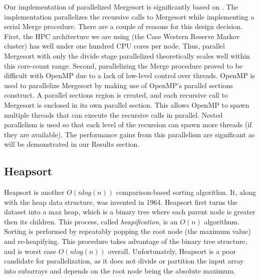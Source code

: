 \documentclass[conference]{IEEEtran}
\begin{document}
    Our implementation of parallelized Mergesort is significantly based on \cite{radenski_mergesort}. The implementation parallelizes the recursive calls to Mergesort while implementing a serial Merge procedure. There are a couple of reasons for this design decision. First, the HPC architecture we are using (the Case Western Reserve Markov cluster) has well under one hundred CPU cores per node. Thus, parallel Mergesort with only the divide stage parallelized theoretically scales well within this core-count range. Second, parallelizing the Merge procedure proved to be difficult with OpenMP due to a lack of low-level control over threads. OpenMP is used to parallelize Mergesort by making use of OpenMP's parallel sections construct. A parallel sections region is created, and each recursive call to Mergesort is enclosed in its own parallel section. This allows OpenMP to spawn multiple threads that can execute the recursive calls in parallel. Nested parallelism is used so that each level of the recursion can spawn more threads (if they are available). The performance gains from this parallelism are significant as will be demonstrated in our Results section.
    
    
    \subsection{Heapsort}
    Heapsort is another $O(nlog(n))$ comparison-based sorting algorithm. 
    It, along with the heap data structure, was invented in 1964. \cite{forsythe_algorithms_1964}
    Heapsort first turns the dataset into a max heap, which is a binary tree where each parent node is greater then its children. 
    This process, called \textit{heapification}, is an $O(n)$ algorithum. 
    Sorting is performed by repeatably popping the root node (the maximum value) and re-heapifying. 
    This procedure takes advantage of the binary tree structure, and is worst case $O(n log (n))$ overall.  \cite{cormen_introduction_2009}
    Unfortunately, Heapsort is a poor candidate for parallelization, as it does not divide or partition the input array into subarrays and depends on the root node being the absolute maximum. 
    
\end{document}
